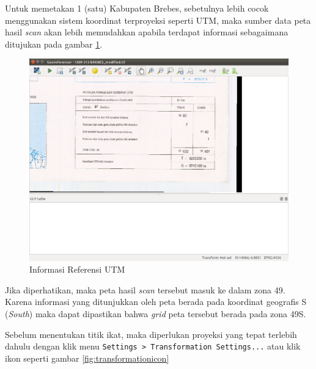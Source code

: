 \begin{enumerate}[1.]
  Untuk memetakan 1 (satu) Kabupaten Brebes, sebetulnya lebih cocok menggunakan sistem koordinat terproyeksi seperti UTM, maka sumber data peta hasil \textit{scan} akan lebih memudahkan apabila terdapat informasi sebagaimana ditujukan pada gambar \ref{fig:refutm}.
  
  \begin{figure}[H]
    \centering
    \includegraphics[width=1\textwidth]{./resources/024-utmpeta}
    \caption{Informasi Referensi UTM}
    \label{fig:refutm}
  \end{figure}
  
  Jika diperhatikan, maka peta hasil \textit{scan} tersebut masuk ke dalam zona 49. Karena informasi yang ditunjukkan oleh peta berada pada koordinat geografis S (\textit{South}) maka dapat dipastikan bahwa \textit{grid} peta tersebut berada pada zona 49S.
  
  Sebelum menentukan titik ikat, maka diperlukan proyeksi yang tepat terlebih dahulu dengan klik menu \verb|Settings > Transformation Settings...| atau klik ikon seperti gambar \ref{fig:transformationicon}
  

\end{enumerate}
